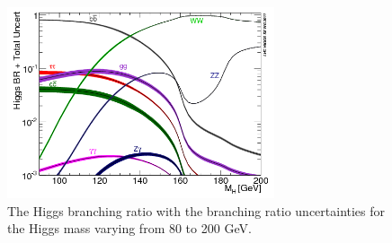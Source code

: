     \begin{figure}[!h]
      \centering
      \includegraphics[width = 0.7\textwidth]{Pictures/Higgs/BRTotalUncertBands_lm.png}
      \caption{The Higgs branching ratio with the branching ratio uncertainties for the Higgs mass varying from 80 to 200 GeV\cite{Denner:2011mq}.}
      \label{fig:higgsProd}
    \end{figure}

%    
%

